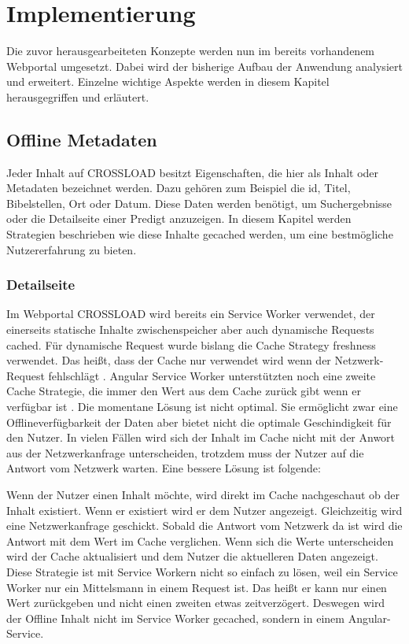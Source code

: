 \chapter{Implementierung}
\label{Kap5}
Die zuvor herausgearbeiteten Konzepte werden nun im bereits vorhandenem Webportal umgesetzt. Dabei wird der bisherige Aufbau der Anwendung analysiert und erweitert. Einzelne wichtige Aspekte werden in diesem Kapitel herausgegriffen und erläutert.

\section{Offline Metadaten}
Jeder Inhalt auf CROSSLOAD besitzt Eigenschaften, die hier als Inhalt oder Metadaten bezeichnet werden. Dazu gehören zum Beispiel die id, Titel, Bibelstellen, Ort oder Datum. Diese Daten werden benötigt, um Suchergebnisse oder die Detailseite einer Predigt anzuzeigen. In diesem Kapitel werden Strategien beschrieben wie diese Inhalte gecached werden, um eine bestmögliche Nutzererfahrung zu bieten.

\subsection{Detailseite}
Im Webportal CROSSLOAD wird bereits ein Service Worker verwendet, der einerseits statische Inhalte zwischenspeicher aber auch dynamische Requests cached. Für dynamische Request wurde bislang die Cache Strategy freshness verwendet. Das heißt, dass der Cache nur verwendet wird wenn der Netzwerk-Request fehlschlägt \autocite{angular-service-worker}. Angular Service Worker unterstützten noch eine zweite Cache Strategie, die immer den Wert aus dem Cache zurück gibt wenn er verfügbar ist \autocite{angular-service-worker}. Die momentane Lösung ist nicht optimal. Sie ermöglicht zwar eine Offlineverfügbarkeit der Daten aber bietet nicht die optimale Geschindigkeit für den Nutzer. In vielen Fällen wird sich der Inhalt im Cache nicht mit der Anwort aus der Netzwerkanfrage unterscheiden, trotzdem muss der Nutzer auf die Antwort vom Netzwerk warten. Eine bessere Lösung ist folgende:

Wenn der Nutzer einen Inhalt möchte, wird direkt im Cache nachgeschaut ob der Inhalt existiert. Wenn er existiert wird er dem Nutzer angezeigt. Gleichzeitig wird eine Netzwerkanfrage geschickt. Sobald die Antwort vom Netzwerk da ist wird die Antwort mit dem Wert im Cache verglichen. Wenn sich die Werte unterscheiden wird der Cache aktualisiert und dem Nutzer die aktuelleren Daten angezeigt. Diese Strategie ist mit Service Workern nicht so einfach zu lösen, weil ein Service Worker nur ein Mittelsmann in einem Request ist. Das heißt er kann nur einen Wert zurückgeben und nicht einen zweiten etwas zeitverzögert. Deswegen wird der Offline Inhalt nicht im Service Worker gecached, sondern in einem Angular-Service.

